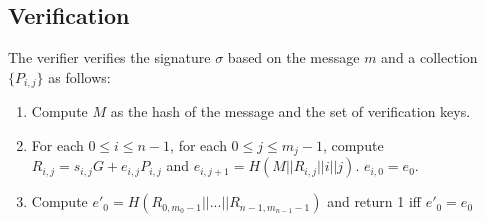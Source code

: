 \documentclass{llncs}
\begin{document}
\subsection{Verification}
The verifier verifies the signature $\sigma$ based on the message $m$ and a collection $\{P_{i,j}\}$ as follows:
\begin{enumerate}
\item Compute $M$ as the hash of the message and the set of verification keys.
\item For each $0\le i \le n-1$, for each $0\le j \le m_j-1$, compute $R_{i,j}=s_{i,j}G+e_{i,j}P_{i,j}$ and $e_{i,j+1} = H(M||R_{i,j}||i||j)$. $e_{i,0}=e_0$.
\item Compute $e'_0=H(R_{0,m_0-1}||...||R_{n-1,m_{n-1}-1})$ and return 1 iff $e'_0=e_0$
\end{enumerate}
\end{document}
